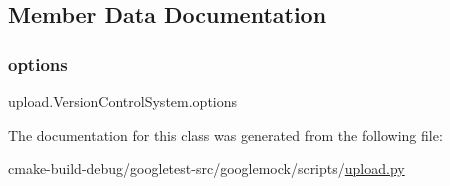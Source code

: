 \subsection{Member Data Documentation}
\mbox{\label{classupload_1_1VersionControlSystem_a4d57d043bc408887b94269fe4cea9556}} 
\subsubsection{\texorpdfstring{options}{options}}
{\footnotesize\ttfamily upload.\+Version\+Control\+System.\+options}



The documentation for this class was generated from the following file\+:\begin{DoxyCompactItemize}
\item 
cmake-\/build-\/debug/googletest-\/src/googlemock/scripts/\mbox{\hyperlink{googlemock_2scripts_2upload_8py}{upload.\+py}}\end{DoxyCompactItemize}
